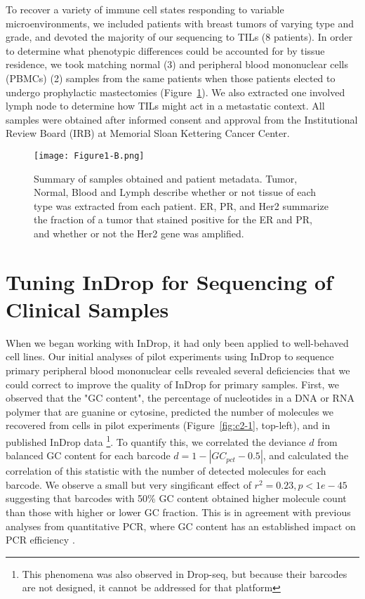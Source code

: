 To recover a variety of immune cell states responding to variable microenvironments, we included patients with breast tumors of varying type and grade, and devoted the majority of our sequencing to TILs (8 patients). 
In order to determine what phenotypic differences could be accounted for by tissue residence, we took matching normal (3) and peripheral blood mononuclear cells (PBMCs) (2) samples from the same patients when those patients elected to undergo prophylactic mastectomies (Figure~\ref{fig:1b}). 
We also extracted one involved lymph node to determine how TILs might act in a metastatic context.  All samples were obtained after informed consent and approval from the Institutional Review Board (IRB) at Memorial Sloan Kettering Cancer Center.

\begin{figure}
\centering
\texttt{[image: Figure1-B.png]}
\caption{Summary of samples obtained and patient metadata. Tumor, Normal, Blood and Lymph describe whether or not tissue of each type was extracted from each patient. ER, PR, and Her2 summarize the fraction of a tumor that stained positive for the ER and PR, and whether or not the Her2 gene was amplified.} 
\label{fig:1b}
\end{figure} 

\section{Tuning InDrop for Sequencing of Clinical Samples}

When we began working with InDrop, it had only been applied to well-behaved cell lines. 
Our initial analyses of pilot experiments using InDrop to sequence primary peripheral blood mononuclear cells revealed several deficiencies that we could correct to improve the quality of InDrop for primary samples.
First, we observed that the "GC content", the percentage of nucleotides in a DNA or RNA polymer that are guanine or cytosine, predicted the number of molecules we recovered from cells in pilot experiments (Figure~\ref{fig:c2-1}, top-left), and in published InDrop data \citep{Klein2015}\footnote{This phenomena was also observed in Drop-seq, but because their barcodes are not designed, it cannot be addressed for that platform}.
To quantify this, we correlated the deviance $d$ from balanced GC content for each barcode $d = 1 - |GC_{pct} - 0.5|$, and calculated the correlation of this statistic with the number of detected molecules for each barcode. 
We observe a small but very singificant effect of $r^{2} = 0.23, p < 1e-45$ suggesting that barcodes with 50\% GC content obtained higher molecule count than those with higher or lower GC fraction.
This is in agreement with previous analyses from quantitative PCR, where GC content has an established impact on PCR efficiency \citep{Mamedov2008}. 

